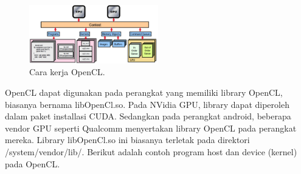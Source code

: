 \begin{figure}
	\centering
	\includegraphics[width=0.50\textwidth]
	{pics/opencl-context.png}
	\caption{Cara kerja OpenCL.}
	\label{fig:context}
\end{figure}

OpenCL dapat digunakan pada perangkat yang memiliki library OpenCL, biasanya bernama libOpenCl.so. Pada NVidia GPU, library dapat diperoleh dalam paket installasi CUDA. Sedangkan pada perangkat android, beberapa vendor GPU seperti Qualcomm menyertakan library OpenCL pada perangkat mereka. Library libOpenCl.so ini biasanya terletak pada direktori /system/vendor/lib/. Berikut adalah contoh program host dan device (kernel) pada OpenCL.

